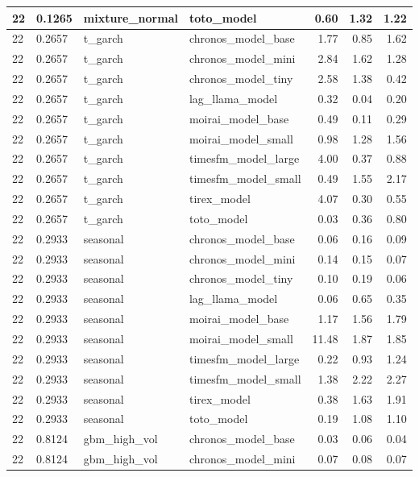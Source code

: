 {\begin{tabular}{llllrrr}
\midrule
22 & 0.1265 & mixture\_normal & toto\_model & 0.60 & 1.32 & 1.22 \\
\midrule
22 & 0.2657 & t\_garch & chronos\_model\_base & 1.77 & 0.85 & 1.62 \\
\midrule
22 & 0.2657 & t\_garch & chronos\_model\_mini & 2.84 & 1.62 & 1.28 \\
\midrule
22 & 0.2657 & t\_garch & chronos\_model\_tiny & 2.58 & 1.38 & 0.42 \\
\midrule
22 & 0.2657 & t\_garch & lag\_llama\_model & 0.32 & 0.04 & 0.20 \\
\midrule
22 & 0.2657 & t\_garch & moirai\_model\_base & 0.49 & 0.11 & 0.29 \\
\midrule
22 & 0.2657 & t\_garch & moirai\_model\_small & 0.98 & 1.28 & 1.56 \\
\midrule
22 & 0.2657 & t\_garch & timesfm\_model\_large & 4.00 & 0.37 & 0.88 \\
\midrule
22 & 0.2657 & t\_garch & timesfm\_model\_small & 0.49 & 1.55 & 2.17 \\
\midrule
22 & 0.2657 & t\_garch & tirex\_model & 4.07 & 0.30 & 0.55 \\
\midrule
22 & 0.2657 & t\_garch & toto\_model & 0.03 & 0.36 & 0.80 \\
\midrule
22 & 0.2933 & seasonal & chronos\_model\_base & 0.06 & 0.16 & 0.09 \\
\midrule
22 & 0.2933 & seasonal & chronos\_model\_mini & 0.14 & 0.15 & 0.07 \\
\midrule
22 & 0.2933 & seasonal & chronos\_model\_tiny & 0.10 & 0.19 & 0.06 \\
\midrule
22 & 0.2933 & seasonal & lag\_llama\_model & 0.06 & 0.65 & 0.35 \\
\midrule
22 & 0.2933 & seasonal & moirai\_model\_base & 1.17 & 1.56 & 1.79 \\
\midrule
22 & 0.2933 & seasonal & moirai\_model\_small & 11.48 & 1.87 & 1.85 \\
\midrule
22 & 0.2933 & seasonal & timesfm\_model\_large & 0.22 & 0.93 & 1.24 \\
\midrule
22 & 0.2933 & seasonal & timesfm\_model\_small & 1.38 & 2.22 & 2.27 \\
\midrule
22 & 0.2933 & seasonal & tirex\_model & 0.38 & 1.63 & 1.91 \\
\midrule
22 & 0.2933 & seasonal & toto\_model & 0.19 & 1.08 & 1.10 \\
\midrule
22 & 0.8124 & gbm\_high\_vol & chronos\_model\_base & 0.03 & 0.06 & 0.04 \\
\midrule
22 & 0.8124 & gbm\_high\_vol & chronos\_model\_mini & 0.07 & 0.08 & 0.07 \\

\end{tabular}}
